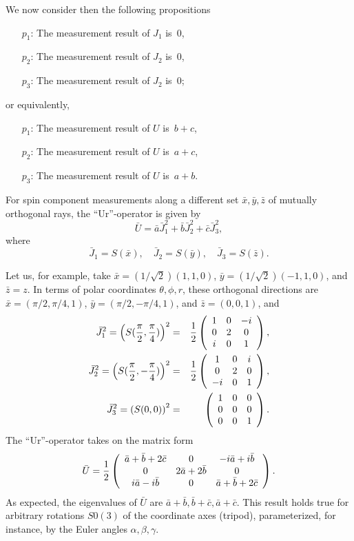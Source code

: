 \documentclass[%
  preprint,
 showpacs,
 showkeys,
 preprintnumbers,
 amsmath,amssymb,
 aps,
 rmp,
  longbibliography,
 ]{revtex4-1}
\begin{document}
We now consider then the following propositions
\begin{itemize}
\item[$p_1$:] The measurement result of $J_1$ is~0,
\item[$p_2$:] The measurement result of $J_2$ is~0,
\item[$p_3$:] The measurement result of $J_2$ is~0;
\end{itemize}
or equivalently,
\begin{itemize}
\item[$p_1$:] The measurement result of $U$ is~$b+c$,
\item[$p_2$:] The measurement result of $U$ is~$a+c$,
\item[$p_3$:] The measurement result of $U$ is~$a+b$.
\end{itemize}


For spin component measurements along a different set $\bar x,\bar
y,\bar z$ of mutually orthogonal rays,
the ``Ur''-operator is given by
$$\bar U=\bar a{\bar J}_1^2+\bar b{\bar J}_2^2+\bar c{\bar J}_3^2,$$
where
$$
{\bar J}_1=S(\bar x),\quad
{\bar J}_2=S(\bar y),\quad
{\bar J}_3=S(\bar z).$$

Let us, for example, take
$\bar x=(1/\sqrt{2})(1,1,0)$,
$\bar y=(1/\sqrt{2})(-1,1,0)$, and
$\bar z=z$.
In terms of polar coordinates $\theta ,\phi ,r$, these orthogonal
directions are
$\bar x=(\pi /2,\pi /4,1)$,
$\bar y=(\pi /2,-\pi /4,1)$, and
$\bar z=(0,0,1)$, and
\begin{eqnarray*}
{\bar J}_1^2= \left(S({\pi \over 2}, {\pi \over 4})\right)^2&=&
{1\over 2}
\left(
\begin{array}{ccc}
1&0&-i\\
0&2&0\\
i&0&1
\end{array}
\right), \\
{\bar J}_2^2= \left(S({\pi \over 2}, -{\pi \over 4})\right)^2&=&
{1\over 2}
\left(
\begin{array}{ccc}
1&0&i\\
0&2&0\\
-i&0&1
\end{array}
\right), \\
{\bar J}_3^2=\left(S(0,0)\right)^2&=&
\left(
\begin{array}{ccc}
1&0&0\\
0&0&0\\
0&0&1\\
\end{array}
\right).
\end{eqnarray*}
The ``Ur''-operator takes on the matrix form
$$
\bar U=
 {1\over 2}
\left(
\begin{array}{ccc}
{\bar a}+{\bar b}+2{\bar c}&0&-i{\bar a}+i\bar b\\
0&2{\bar a}+2\bar b&0\\
i{\bar a}-i\bar b&0&{\bar a}+{\bar b}+2{\bar c}
\end{array}
\right).$$
As expected, the eigenvalues of
$\bar U$ are
$
\bar a+\bar b,
\bar b+\bar c,
\bar a+\bar c$.
This result holds true for arbitrary
rotations $S0(3)$
\cite{murnaghan}
of the coordinate axes
(tripod), parameterized, for instance, by the Euler angles
$\alpha ,\beta , \gamma$.
\end{document}
